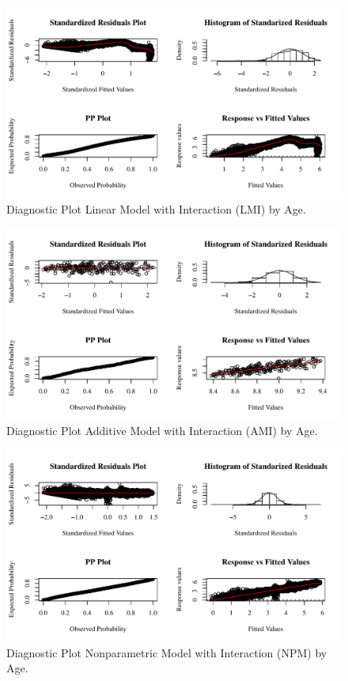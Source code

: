 \documentclass{article}\usepackage[]{graphicx}\usepackage[]{color}
\begin{document}
\begin{figure}[bp!]
\centering
\includegraphics[scale=0.8]{Diag_b_lm_age_2004.pdf}
\caption{Diagnostic Plot Linear Model with Interaction (LMI) by Age.}
\label{fig:Diag LMI Age}
\end{figure}

\begin{figure}[bp!]
\centering
\includegraphics[scale=0.8]{Diag_b_gam_comp_2004.pdf}
\caption{Diagnostic Plot Additive Model with Interaction (AMI) by Age.}
\label{fig:Diag AMI Age}
\end{figure}

\begin{figure}[h!]
\centering
\includegraphics[scale=0.8]{Diag_b_vc_age_2004.pdf}
\caption{Diagnostic Plot Nonparametric Model with Interaction (NPM) by Age.}
\label{fig:Diag NPM Age}
\end{figure}


\newpage


\end{document}
